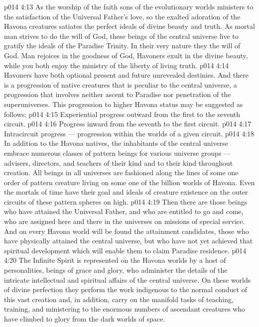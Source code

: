 \vs p014 4:13 As the worship of the faith sons of the evolutionary worlds ministers to the satisfaction of the Universal Father’s love, so the exalted adoration of the Havona creatures satiates the perfect ideals of divine beauty and truth. As mortal man strives to do the will of God, these beings of the central universe live to gratify the ideals of the Paradise Trinity. In their very nature they  the will of God. Man rejoices in the goodness of God, Havoners exult in the divine beauty, while you both enjoy the ministry of the liberty of living truth.
\vs p014 4:14 Havoners have both optional present and future unrevealed destinies. And there is a progression of native creatures that is peculiar to the central universe, a progression that involves neither ascent to Paradise nor penetration of the superuniverses. This progression to higher Havona status may be suggested as follows:
\vs p014 4:15 \bibnobreakspace Experiential progress outward from the first to the seventh circuit.
\vs p014 4:16 \bibnobreakspace Progress inward from the seventh to the first circuit.
\vs p014 4:17 \bibnobreakspace Intracircuit progress --- progression with\-in the worlds of a given circuit.
\vs p014 4:18 \pc In addition to the Havona natives, the inhabitants of the central universe embrace numerous classes of pattern beings for various universe groups --- advisers, directors, and teachers of their kind and to their kind throughout creation. All beings in all universes are fashioned along the lines of some one order of pattern creature living on some one of the billion worlds of Havona. Even the mortals of time have their goal and ideals of creature existence on the outer circuits of these pattern spheres on high.
\vs p014 4:19 Then there are those beings who have attained the Universal Father, and who are entitled to go and come, who are assigned here and there in the universes on missions of special service. And on every Havona world will be found the attainment candidates, those who have physically attained the central universe, but who have not yet achieved that spiritual development which will enable them to claim Paradise residence.
\vs p014 4:20 The Infinite Spirit is represented on the Havona worlds by a host of personalities, beings of grace and glory, who administer the details of the intricate intellectual and spiritual affairs of the central universe. On these worlds of divine perfection they perform the work indigenous to the normal conduct of this vast creation and, in addition, carry on the manifold tasks of teaching, training, and ministering to the enormous numbers of ascendant creatures who have climbed to glory from the dark worlds of space.
